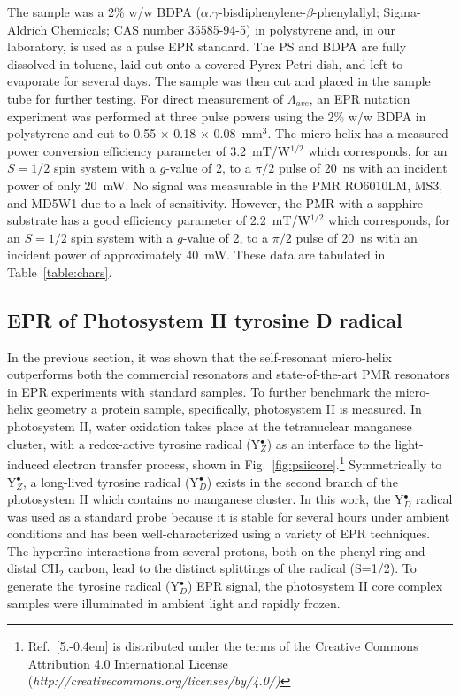 The sample was a 2\% w/w BDPA ($\alpha$,$\gamma$-bisdiphenylene-$\beta$-phenylallyl; Sigma-Aldrich Chemicals; CAS number 35585-94-5) in polystyrene and, in our laboratory, is used as a pulse EPR standard. The PS and BDPA are fully dissolved in toluene, laid out onto a covered Pyrex Petri dish, and left to evaporate for several days. The sample was then cut and placed in the sample tube for further testing. For direct measurement of $\Lambda_{ave}$, an EPR nutation experiment was performed at three pulse powers using the 2\% w/w BDPA in polystyrene and cut to 0.55 $\times$ 0.18 $\times$ 0.08~mm$^3$. The micro-helix has a measured power conversion efficiency parameter of 3.2~mT/W$^{1/2}$ which corresponds, for an $S=1/2$ spin system with a $g$-value of 2, to a $\pi/2$ pulse of 20~ns with an incident power of only 20~mW. No signal was measurable in the PMR RO6010LM, MS3, and MD5W1 due to a lack of sensitivity. However, the PMR with a sapphire substrate has a good efficiency parameter of 2.2~mT/W$^{1/2}$ which corresponds, for an $S=1/2$ spin system with a $g$-value of 2, to a $\pi/2$ pulse of 20~ns with an incident power of approximately 40~mW. These data are tabulated in Table~\ref{table:chars}.

\subsection{EPR of Photosystem II tyrosine D radical}
In the previous section, it was shown that the self-resonant micro-helix outperforms both the commercial resonators and state-of-the-art PMR resonators in EPR experiments with standard samples. To further benchmark the micro-helix geometry a protein sample, specifically, photosystem II is measured. In photosystem II, water oxidation takes place at the tetranuclear manganese cluster, with a redox-active tyrosine radical (Y$_Z^\bullet$) as an interface to the light-induced electron transfer process, \cite{Lubitz2019} shown in Fig.~\ref{fig:psiicore}.\footnote{\label{CCnotRef} Ref.~[5.\kern-0.4em] is distributed under the terms of the Creative Commons Attribution 4.0 International License (\textit{http://creativecommons.org/licenses/by/4.0/)}} Symmetrically to Y$_Z^\bullet$, a long-lived tyrosine radical (Y$_D^\bullet$) exists in the second branch of the photosystem II which contains no manganese cluster. In this work, the Y$_D^\bullet$ radical was used as a standard probe because it is stable for several hours under ambient conditions\cite{Saito7690} and has been well-characterized using a variety of EPR techniques. \cite{Hofbauer6623, STYRING201276} The hyperfine interactions from several protons, both on the phenyl ring and distal CH$_2$ carbon, lead to the distinct splittings of the radical (S=1/2). To generate the tyrosine radical (Y$_D^\bullet$) EPR signal, the photosystem II core complex samples were illuminated in ambient light and rapidly frozen. 

